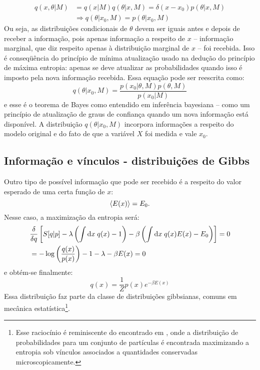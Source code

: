 \begin{align*}
 q(x,\theta|M) &= q(x|M)q(\theta|x, M) =  \delta(x-x_0) p(\theta|x, M) \\ &\Rightarrow q(\theta|x_0, M) = p(\theta|x_0, M)
\end{align*}
Ou seja, as distribuições condicionais de $\theta$ devem ser iguais antes e depois de receber a informação, pois apenas informação a respeito de $x$ -- informação marginal, que diz respeito apenas à distribuição marginal de $x$ -- foi recebida. Isso é conseqüência do princípio de mínima atualização usado na dedução do princípio de máxima entropia: apenas se deve atualizar as probabilidades quando isso é imposto pela nova informação recebida. Essa equação pode ser reescrita como:
\begin{equation}
 q(\theta | x_0, M) = \dfrac{p(x_0 | \theta, M)p(\theta, M)}{p(x_0 |M)}
\end{equation}
e esse é o teorema de Bayes como entendido em inferência bayesiana -- como um princípio de atualização de graus de confiança quando um nova informação está disponível. A distribuição $q(\theta | x_0, M)$ incorpora informações a respeito do modelo original e do fato de que a variável $X$ foi medida e vale $x_0$. 

\subsection{Informação e vínculos - distribuições de Gibbs}
Outro tipo de possível informação que pode ser recebido é a respeito do valor esperado de uma certa função de $x$:
\[
 \left\langle E(x) \right\rangle = E_0.
\]
Nesse caso, a maximização da entropia será:
\begin{align*}
  &\frac{\delta}{\delta q} \left[S[q | p] - \lambda \left(\int \mathrm{d} x\; q(x) -1 \right) - \beta\left(\int\mathrm{d} x\; q(x) E(x) - E_0\right)\right] =0\\
  &= - \log\left(\frac{q(x)}{p(x)}\right) - 1 - \lambda -\beta E(x) = 0
\end{align*}
e obtém-se finalmente:
\begin{equation}
\label{eq:gibbs}
 q(x) = \dfrac{1}{Z}p(x) e^{-\beta E(x)}
\end{equation}
Essa distribuição faz parte da classe de distribuições gibbsianas, comuns em mecânica estatística\footnote[][-5.5cm]{Esse raciocínio é reminiscente do encontrado em \citet{Landau1980}, onde a distribuição de probabilidades para um conjunto de partículas é encontrada maximizando a entropia sob vínculos associados a quantidades conservadas microscopicamente.}\cite[-3cm]{Landau1980}.

